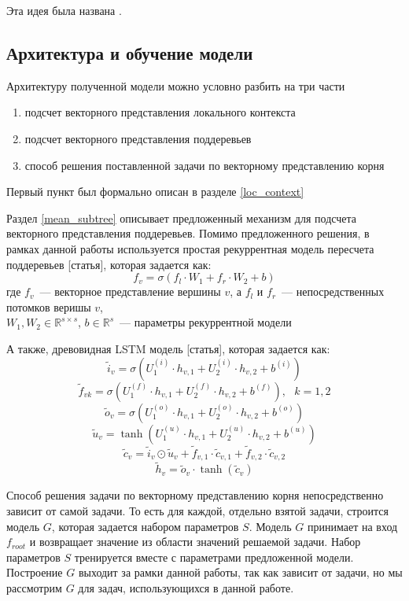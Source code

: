 Эта идея была названа .

\subsection{Архитектура и обучение модели} \label{arch}

Архитектуру полученной модели можно условно разбить на три части
\begin{enumerate}
    \item{подсчет векторного представления локального контекста}
    \item{подсчет векторного представления поддеревьев}
    \item{способ решения поставленной задачи по векторному представлению корня}
\end{enumerate}

Первый пункт был формально описан в разделе \ref{loc_context}

Раздел \ref{mean_subtree} описывает предложенный механизм для подсчета векторного представления поддеревьев.
Помимо предложенного решения, в рамках данной работы используется простая рекуррентная модель пересчета поддеревьев [статья], которая задается как:
$$f_v = \sigma(f_l \cdot W_1 + f_r \cdot W_2 + b)$$
где $f_v$~--- векторное представление вершины $v$, а $f_l$ и $f_r$~--- непосредственных
потомков веришы $v$,\\
$W_1, W_2 \in \mathbb{R}^{s \times s}$,
$b \in \mathbb{R}^s$~--- параметры рекуррентной модели

А также, древовидная LSTM модель [статья], которая задается как:
$$\tilde{i}_v=\sigma \left( U_1^{(i)} \cdot h_{v,1} + U_2^{(i)} \cdot h_{v,2} + b^{(i)} \right)$$
$$\tilde{f}_{vk}=\sigma \left( U_1^{(f)} \cdot h_{v,1} + U_2^{(f)} \cdot h_{v,2} + b^{(f)} \right),\text{ }k=1,2$$
$$\tilde{o}_{v}=\sigma \left( U_1^{(o)} \cdot h_{v,1} + U_2^{(o)} \cdot h_{v,2} + b^{(o)} \right)$$
$$\tilde{u}_{v}=\tanh \left( U_1^{(u)} \cdot h_{v,1} + U_2^{(u)} \cdot h_{v,2} + b^{(u)} \right)$$
$$\tilde{c}_v=\tilde{i}_v \odot \tilde{u}_v + \tilde{f}_{v,1} \cdot \tilde{c}_{v, 1} + \tilde{f}_{v,2} \cdot \tilde{c}_{v, 2}$$
$$\tilde{h}_v=\tilde{o}_v \cdot \tanh(\tilde{c}_v)$$

Способ решения задачи по векторному представлению корня непосредственно зависит от самой задачи.
То есть для каждой, отдельно взятой задачи, строится модель $G$, которая задается набором параметров $S$.
Модель $G$ принимает на вход $f_{root}$ и возвращает значение из области значений решаемой задачи. 
Набор параметров $S$ тренируется вместе с параметрами предложенной модели. Построение $G$ выходит за рамки данной работы, так как зависит от задачи, но мы рассмотрим $G$ для задач, использующихся в данной работе.

